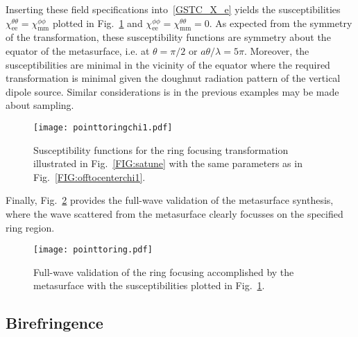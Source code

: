\documentclass[journal,transaction]{IEEEtran}
\newcommand{\figref}{Fig.~\ref}
\begin{document}
Inserting these field specifications into~\eqref{GSTC_X_e} yields the susceptibilities $\chi_\text{ee}^{\theta\theta}=\chi_\text{mm}^{\phi\phi}$ plotted in \figref{FIG:pointtoringchi1} and $\chi_\text{ee}^{\phi\phi}=\chi_\text{mm}^{\theta\theta}=0$.
As expected from the symmetry of the transformation, these susceptibility functions are symmetry about the equator of the metasurface, i.e. at $\theta=\pi/2$ or $a\theta/\lambda=5\pi$. Moreover, the susceptibilities are minimal in the vicinity of the equator where the required transformation is minimal given the doughnut radiation pattern of the vertical dipole source. Similar considerations is in the previous examples may be made about sampling.

\begin{figure}[!h]
    \centering
         \texttt{[image: pointtoringchi1.pdf]}{
        }
        \caption{Susceptibility functions for the ring focusing transformation illustrated in \figref{FIG:satune} with the same parameters as in \figref{FIG:offtocenterchi1}.}
   \label{FIG:pointtoringchi1}
\end{figure}

Finally, \figref{FIG:pointtoring} provides the full-wave validation of the metasurface synthesis, where the wave scattered from the metasurface clearly focusses on the specified ring region.

\begin{figure}[!h]
    \centering
         \texttt{[image: pointtoring.pdf]}{
        }
        \caption{Full-wave validation of the ring focusing accomplished by the metasurface with the susceptibilities plotted in \figref{FIG:pointtoringchi1}.}
   \label{FIG:pointtoring}
\end{figure}

\subsection{Birefringence}
\end{document}
